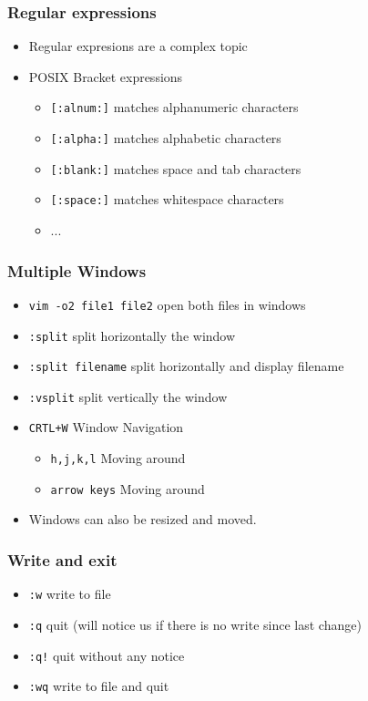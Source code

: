 \documentclass{beamer}
\begin{document}
\begin{frame}
\frametitle{Regular expressions}

\begin{itemize}
\item Regular expresions are a complex topic
\item POSIX Bracket expressions
\begin{itemize}
\item \texttt{[:alnum:]} matches alphanumeric characters
\item \texttt{[:alpha:]} matches alphabetic characters
\item \texttt{[:blank:]} matches space and tab characters
\item \texttt{[:space:]} matches whitespace characters
\item ...
\end{itemize}
\end{itemize}

\end{frame}



\begin{frame}
\frametitle{Multiple Windows}

\begin{itemize}
\item \texttt{vim -o2 file1 file2} open both files in windows
\item \texttt{:split} split horizontally the window
\item \texttt{:split filename} split horizontally and display filename
\item \texttt{:vsplit} split vertically the window
\item \texttt{CRTL+W} Window Navigation
\begin{itemize}
\item \texttt{h,j,k,l} Moving around
\item \texttt{arrow keys} Moving around
\end{itemize}
\item Windows can also be resized and moved.
\end{itemize}

\end{frame}


\begin{frame}
\frametitle{Write and exit}

\begin{itemize}
\item \texttt{:w} write to file
\item \texttt{:q} quit (will notice us if there is no write since last change)
\item \texttt{:q!} quit without any notice
\item \texttt{:wq} write to file and quit 
\end{itemize}

\end{frame}
\end{document}
